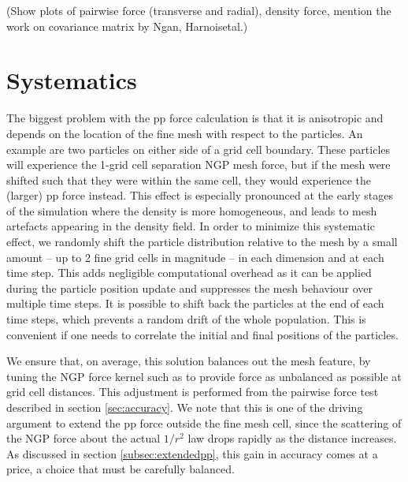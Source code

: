(Show plots of pairwise force (transverse and radial), density force, 
mention the work on covariance matrix by Ngan, Harnoisetal.)


\section{Systematics}
\label{sec:systematics}


The biggest problem with the pp force calculation is that it 
is anisotropic and depends on the location of the fine mesh with respect 
to the particles. An example are two particles on either side of a grid 
cell boundary. These particles will experience the 1-grid cell separation
NGP mesh force, but if the mesh were shifted such that they were
within the same cell, they would experience the (larger) pp force instead. 
This effect is especially pronounced at the early stages of the simulation where
the density is more homogeneous, and leads to mesh artefacts appearing
in the density field. In order to minimize this systematic effect, 
we randomly shift the particle distribution relative to the mesh by a small
amount -- up to 2 fine grid cells in magnitude -- in each
dimension and at each time step.  This adds negligible computational
overhead as it can be applied during the particle position update
and suppresses the mesh behaviour over multiple time steps.
It is possible to shift back the particles at the end of each time steps,
which prevents a random drift of the whole population.
This is convenient if one needs to correlate the initial and final positions of the particles.
 
We ensure that, on average, this solution balances out the mesh feature,
by tuning the NGP force kernel such as to provide  force as unbalanced as possible at grid cell distances.
This adjustment is performed from the pairwise force test described in section \ref{sec:accuracy}.
We note that this is one of the driving argument to extend the pp force outside the fine mesh cell,
since the scattering of the NGP force about the actual $1/r^{2}$ law drops rapidly as the distance increases.
As discussed in section \ref{subsec:extendedpp}, this gain in accuracy comes at a price,
a choice that  must be carefully balanced.

